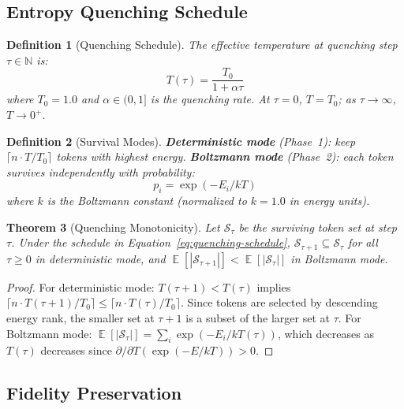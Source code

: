 \documentclass[11pt]{article}
\newtheorem{theorem}{Theorem}[section]
\newtheorem{definition}[theorem]{Definition}
\theoremstyle{remark}
\DeclareMathOperator{\E}{\mathbb{E}}
\newcommand{\N}{\mathbb{N}}
\begin{document}
\subsection{Entropy Quenching Schedule}
\label{sec:quenching}

\begin{definition}[Quenching Schedule]
\label{def:quenching}
The effective temperature at quenching step $\tau \in \N$ is:
\begin{equation}
    T(\tau) = \frac{T_0}{1 + \alpha \tau}
    \label{eq:quenching-schedule}
\end{equation}
where $T_0 = 1.0$ and $\alpha \in (0, 1]$ is the quenching rate.
At $\tau = 0$, $T = T_0$; as $\tau \to \infty$, $T \to 0^+$.
\end{definition}

\begin{definition}[Survival Modes]
\label{def:survival}
\textbf{Deterministic mode} (Phase~1): keep $\lceil n \cdot T/T_0 \rceil$
tokens with highest energy. \textbf{Boltzmann mode} (Phase~2): each token
survives independently with probability:
\begin{equation}
    p_i = \exp(-E_i / kT)
    \label{eq:boltzmann}
\end{equation}
where $k$ is the Boltzmann constant (normalized to $k = 1.0$ in energy units).
\end{definition}

\begin{theorem}[Quenching Monotonicity]
\label{thm:monotonicity}
Let $\mathcal{S}_\tau$ be the surviving token set at step $\tau$. Under
the schedule in Equation~\ref{eq:quenching-schedule}, $\mathcal{S}_{\tau+1}
\subseteq \mathcal{S}_\tau$ for all $\tau \geq 0$ in deterministic mode,
and $\E[|\mathcal{S}_{\tau+1}|] < \E[|\mathcal{S}_\tau|]$ in Boltzmann mode.
\end{theorem}

\begin{proof}
For deterministic mode: $T(\tau+1) < T(\tau)$ implies
$\lceil n \cdot T(\tau+1)/T_0 \rceil \leq \lceil n \cdot T(\tau)/T_0 \rceil$.
Since tokens are selected by descending energy rank, the smaller set at
$\tau+1$ is a subset of the larger set at $\tau$. For Boltzmann mode:
$\E[|\mathcal{S}_\tau|] = \sum_i \exp(-E_i/kT(\tau))$, which decreases as
$T(\tau)$ decreases since $\partial/\partial T (\exp(-E/kT)) > 0$.
\end{proof}

\subsection{Fidelity Preservation}
\label{sec:fidelity}
\end{document}
